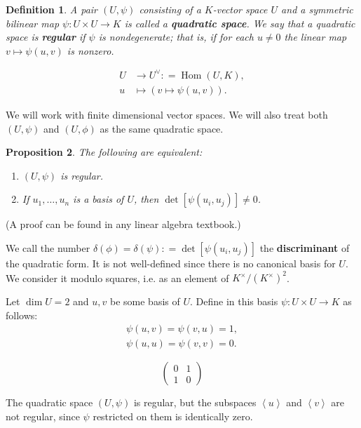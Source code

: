 \documentclass{article}
\newcommand{\term}{\textbf}
\newcommand{\dfn}{\mathrel{\mathop:}=}
\DeclareMathOperator{\Hom}{Hom}
\newcommand{\examplesymbol}{$\blacktriangle$}
\renewcommand{\qedsymbol}{$\blacksquare$}
\theoremstyle{myplain}
\newtheorem{proposition}{Proposition}[section]
\theoremstyle{mydefinition}
\newtheorem{definition}[proposition]{Definition}
\newenvironment{example}
  {\pushQED{\qed}\renewcommand{\qedsymbol}{\examplesymbol}\examplex}
  {\popQED\endexamplex}
\begin{document}
\begin{definition}
  A pair $(U,\psi)$ consisting of a $K$-vector space $U$ and a symmetric
  bilinear map $\psi\colon U\times U\to K$ is called a \term{quadratic
    space}. We say that a quadratic space is \term{regular} if $\psi$ is
  nondegenerate; that is, if for each $u \ne 0$ the linear map
  $v \mapsto \psi (u,v)$ is nonzero.

  \begin{align*}
    U & \to U^\vee \dfn \Hom (U,K),\\
    u & \mapsto (v \mapsto \psi (u,v)).
  \end{align*}
\end{definition}

We will work with finite dimensional vector spaces. We will also treat both
$(U,\psi)$ and $(U,\phi)$ as the same quadratic space.

\begin{proposition}
  The following are equivalent:
  \begin{enumerate}
  \item $(U,\psi)$ is regular.

  \item If $u_1, \ldots, u_n$ is a basis of $U$, then
    $\det [\psi (u_i, u_j)] \ne 0$.
  \end{enumerate}
\end{proposition}

\noindent (A proof can be found in any linear algebra textbook.)

\vspace{1em}

We call the number $\delta (\phi) = \delta (\psi) \dfn \det [\psi (u_i, u_j)]$
the \term{discriminant} of the quadratic form. It is not well-defined since
there is no canonical basis for $U$. We consider it modulo squares, i.e. as an
element of $K^\times / (K^\times)^2$.

\begin{example}\label{example:hyperbolic-plane}
  Let $\dim U = 2$ and $u,v$ be some basis of $U$. Define in this basis
  $\psi\colon U\times U\to K$ as follows:
  \begin{gather*}
    \psi (u,v) = \psi (v,u) = 1,\\
    \psi (u,u) = \psi (v,v) = 0.
  \end{gather*}

  \[ \begin{pmatrix}
      0 & 1 \\
      1 & 0
    \end{pmatrix} \]

  The quadratic space $(U, \psi)$ is regular, but the subspaces $\left<u\right>$
  and $\left<v\right>$ are not regular, since $\psi$ restricted on them is
  identically zero.
\end{example}
\end{document}
